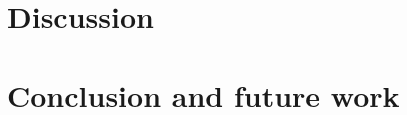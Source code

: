\documentclass[11pt, a4paper,oneside,chapterprefix=false]{scrbook}
\begin{document}
\chapter{Discussion} \label{chp:discussion}

\chapter{Conclusion and future work} \label{chp:conclusion}



\end{document}
